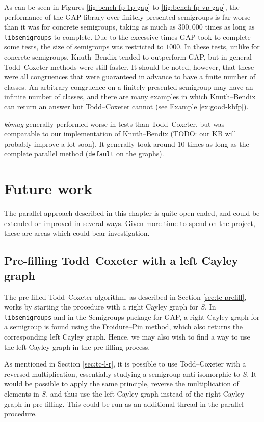 As can be seen in Figures \ref{fig:bench-fp-1p-gap} to \ref{fig:bench-fp-vp-gap}, the
performance of the GAP library over finitely presented semigroups is far worse
than it was for concrete semigroups, taking as much as $300,000$ times as long
as \texttt{libsemigroups} to complete.  Due to the excessive times GAP took to
complete some tests, the size of semigroups was restricted to $1000$.  In these
tests, unlike for concrete semigroups,
Knuth--Bendix tended to outperform GAP, but in
general Todd--Coxeter methods were still faster.  It should be noted, however,
that these were all congruences that were guaranteed in advance to have a finite
number of classes.  An arbitrary congruence on a finitely presented semigroup
may have an infinite number of classes, and there are many examples in which
Knuth--Bendix can return an answer but Todd--Coxeter cannot (see Example
\ref{ex:good-kbfp}).

\textit{kbmag} generally performed worse in tests than Todd--Coxeter, but was
comparable to our implementation of Knuth--Bendix (TODO: our KB will probably
improve a lot soon).  It generally took around $10$ times as long as the
complete parallel method (\texttt{default} on the graphs).

\section{Future work}

The parallel approach described in this chapter is quite open-ended, and could
be extended or improved in several ways.  Given more time to spend on the
project, these are areas which could bear investigation.

\subsection{Pre-filling Todd--Coxeter with a left Cayley graph}
\label{sec:prefill-left}
The pre-filled Todd--Coxeter algorithm, as described in Section
\ref{sec:tc-prefill}, works by starting the procedure with a right Cayley graph
for $S$.  In \texttt{libsemigroups} and in the Semigroups package for GAP, a
right Cayley graph for a semigroup is found using the Froidure--Pin method, which
also returns the corresponding left Cayley graph.  Hence, we may also wish to
find a way to use the left Cayley graph in the pre-filling process.

As mentioned in Section \ref{sec:tc-l-r}, it is possible to use Todd--Coxeter
with a reversed multiplication, essentially studying a semigroup anti-isomorphic
to $S$.  It would be possible to apply the same principle, reverse the
multiplication of elements in $S$, and thus use the left Cayley graph instead of
the right Cayley graph in pre-filling.  This could be run as an additional
thread in the parallel procedure.

